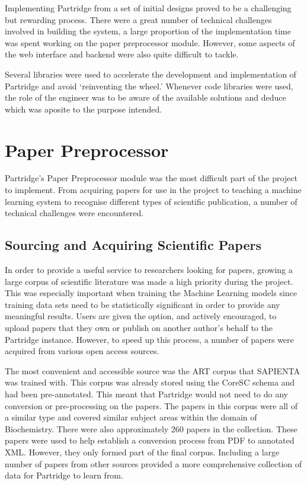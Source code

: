 %  
%

Implementing Partridge from a set of initial designs proved to be a
challenging but rewarding process. There were a great number of technical
challenges involved in building the system, a large proportion of the
implementation time was spent working on the paper preprocessor module.
However, some aspects of the web interface and backend were also quite
difficult to tackle. 

Several libraries were used to accelerate the development and implementation of
Partridge and avoid `reinventing the wheel.' Whenever code libraries were used,
the role of the engineer was to be aware of the available solutions and deduce
which was aposite to the purpose intended.

\section{Paper Preprocessor}

Partridge's Paper Preprocessor module was the most difficult part of the
project to implement. From acquiring papers for use in the project to teaching
a machine learning system to recognise different types of scientific
publication, a number of technical challenges were encountered.

\subsection{ Sourcing and Acquiring Scientific Papers}

In order to provide a useful service to researchers looking for papers, growing
a large corpus of scientific literature was made a high priority during the
project. This was especially important when training the Machine Learning
models since training data sets need to be statistically significant in order
to provide any meaningful results. Users are given the option, and actively
encouraged, to upload papers that they own or publish on another author's
behalf to the Partridge instance. However, to speed up this process, a number
of papers were acquired from various open access sources.

The most convenient and accessible source was the ART corpus that SAPIENTA was
trained with\cite{citeulike:11077287}. This corpus was already stored using the
CoreSC schema and had been pre-annotated. This meant that Partridge would not
need to do any conversion or pre-processing on the papers. The papers in this
corpus were all of a similar type and covered similar subject areas within the
domain of Biochemistry. There were also approximately 260 papers in the
collection. These papers were used to help establish a conversion process from
PDF to annotated XML. However, they only formed part of the final corpus.
Including a large number of papers from other sources provided a more
comprehensive collection of data for Partridge to learn from.

